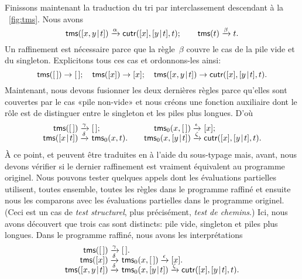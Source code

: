 Finissons maintenant la traduction du tri par interclassement
descendant à la \fig~\vref{fig:tms}. Nous avons
\begin{equation*}
\textsf{tms}([{x,y}\!\mid\!{t}]) \xrightarrow{\smash{\alpha}}
 \textsf{cutr}([x],[{y}\!\mid\!{t}],t);\qquad
\textsf{tms}(t) \xrightarrow{\smash{\beta}} t.
\end{equation*}
Un raffinement est nécessaire parce que la règle~\(\beta\) couvre le
cas de la pile vide et du singleton. Explicitons tous ces cas et
ordonnons-les ainsi:
\begin{equation*}
\textsf{tms}([\,])            \rightarrow  [\,];\quad
\textsf{tms}([x])            \rightarrow  [x];\quad
\textsf{tms}([{x,y}\!\mid\!{t}])  \rightarrow
                          \textsf{cutr}([x],[{y}\!\mid\!{t}],t).
\end{equation*}
Maintenant, nous devons fusionner les deux dernières règles parce
qu'elles sont couvertes par le cas «pile non-vide» et nous créons une
fonction auxiliaire  dont le rôle est de distinguer
entre le singleton et les piles plus longues. D'où
\begin{equation*}
\begin{array}{@{}r@{\;}l@{\;}l@{\qquad}r@{\;}l@{\;}l@{}}
  \fun{tms}(\el)             & \xrightarrow{\smash{\gamma}} & \el;
& \fun{tms}_0(x,\el)         & \xrightarrow{\smash{\epsilon}} & [x];\\
\fun{tms}(\cons{x}{t})       & \xrightarrow{\smash{\delta}}
                             & \fun{tms}_0(x,t).
& \fun{tms}_0(x,\cons{y}{t}) & \xrightarrow{\smash{\zeta}}
                             & \fun{cutr}([x],\cons{y}{t},t).
\end{array}
\end{equation*}
À ce point,  et  peuvent être traduites en
\Java à l'aide du sous-typage mais, avant, nous devons vérifier si le
dernier raffinement est vraiment équivalent au programme
originel. Nous pouvons tester quelques appels dont les évaluations
partielles
utilisent, toutes ensemble, toutes les règles dans le programme
raffiné et ensuite nous les comparons avec les évaluations partielles
dans le programme originel. (Ceci est un cas de \emph{test
  structurel}, plus précisément,
\emph{test de chemins}.) Ici, nous avons
découvert que trois cas sont distincts: pile vide, singleton et piles
plus longues. Dans le programme raffiné, nous avons les
interprétations
\begin{equation*}
\begin{array}{@{}r@{\;}l@{\;}l@{}}
\fun{tms}(\el) & \xrightarrow{\smash{\gamma}} & \el.\\
\fun{tms}([x]) & \xrightarrow{\smash{\delta}} & \fun{tms}_0(x,\el)
                 \xrightarrow{\smash{\epsilon}} [x].\\
\fun{tms}(\cons{x,y}{t})
  & \xrightarrow{\smash{\delta}} & \fun{tms}_0(x,\cons{y}{t})
    \xrightarrow{\smash{\zeta}} \fun{cutr}([x],\cons{y}{t},t).
\end{array}
\end{equation*}
